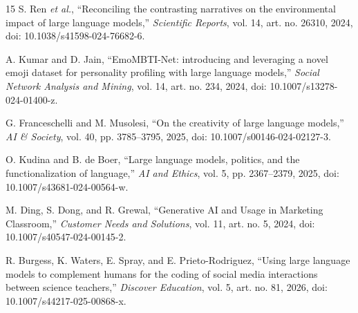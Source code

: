 \documentclass[conference]{IEEEtran}
\begin{document}
\begin{thebibliography}{15}
S. Ren \emph{et al.}, ``Reconciling the contrasting narratives on the environmental impact of large language models,'' \emph{Scientific Reports}, vol. 14, art. no. 26310, 2024, doi: 10.1038/s41598-024-76682-6.

A. Kumar and D. Jain, ``EmoMBTI-Net: introducing and leveraging a novel emoji dataset for personality profiling with large language models,'' \emph{Social Network Analysis and Mining}, vol. 14, art. no. 234, 2024, doi: 10.1007/s13278-024-01400-z.

G. Franceschelli and M. Musolesi, ``On the creativity of large language models,'' \emph{AI \& Society}, vol. 40, pp. 3785--3795, 2025, doi: 10.1007/s00146-024-02127-3.

O. Kudina and B. de Boer, ``Large language models, politics, and the functionalization of language,'' \emph{AI and Ethics}, vol. 5, pp. 2367--2379, 2025, doi: 10.1007/s43681-024-00564-w.

M. Ding, S. Dong, and R. Grewal, ``Generative AI and Usage in Marketing Classroom,'' \emph{Customer Needs and Solutions}, vol. 11, art. no. 5, 2024, doi: 10.1007/s40547-024-00145-2.

R. Burgess, K. Waters, E. Spray, and E. Prieto-Rodriguez, ``Using large language models to complement humans for the coding of social media interactions between science teachers,'' \emph{Discover Education}, vol. 5, art. no. 81, 2026, doi: 10.1007/s44217-025-00868-x.

\end{thebibliography}
\end{document}
